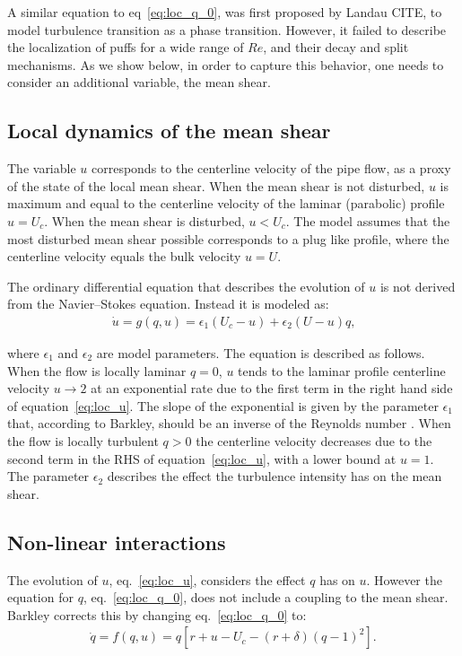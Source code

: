 \documentclass{article}
\begin{document}
A similar equation to eq~\ref{eq:loc_q_0}, was first proposed by Landau CITE, to model turbulence transition as a phase transition. However, it failed to describe the localization of puffs for a wide range of $Re$, and their decay and split mechanisms. As we show below, in order to capture this behavior, one needs to consider an additional variable, the mean shear.






\subsection{Local dynamics of the mean shear}
The variable $u$ corresponds to the centerline velocity of the pipe flow, as a proxy of the state of the local mean shear. When the mean shear is not disturbed, $u$ is maximum and equal to the centerline velocity of the laminar (parabolic) profile $u=U_{c}$. When the mean shear is disturbed, $u<U_{c}$. The model assumes that the most disturbed mean shear possible corresponds to a plug like profile, where the centerline velocity equals the bulk velocity $u=U$. 

The ordinary differential equation that describes the evolution of $u$ is not derived from the Navier--Stokes equation. Instead it is modeled as:
\begin{align}
\dot{u}=g\left(q,u\right)= \epsilon_{1} \left(U_{c}-u \right) + \epsilon_{2} \left(U-u \right)q \text{,}
\label{eq:loc_u}
\end{align}

where $\epsilon_{1}$ and $\epsilon_{2}$ are model parameters. The equation is described as follows. When the flow is locally laminar $q=0$, $u$ tends to the laminar profile centerline velocity $u \rightarrow 2$ at an exponential rate due to the first term in the right hand side of equation~\ref{eq:loc_u}. The slope of the exponential is given by the parameter $\epsilon_{1}$ that, according to Barkley, should be an inverse of the Reynolds number \cite{barkley2016}. When the flow is locally turbulent $q>0$ the centerline velocity decreases due to the second term in the RHS of equation~\ref{eq:loc_u}, with a lower bound at $u=1$. The parameter $\epsilon_{2}$ describes the effect the turbulence intensity has on the mean shear. 





\subsection{Non-linear interactions}
The evolution of $u$, eq.~\ref{eq:loc_u}, considers the effect $q$ has on $u$. However the equation for $q$, eq.~\ref{eq:loc_q_0}, does not include a coupling to the mean shear. Barkley corrects this by changing eq.~\ref{eq:loc_q_0} to: 
\begin{align}
\dot{q}=f\left(q,u\right)=q \left[r+u-U_{c}-\left(r+\delta \right) \left(q -1 \right)^{2} \right]\text{.}
\label{eq:loc_q}
\end{align}
\end{document}
